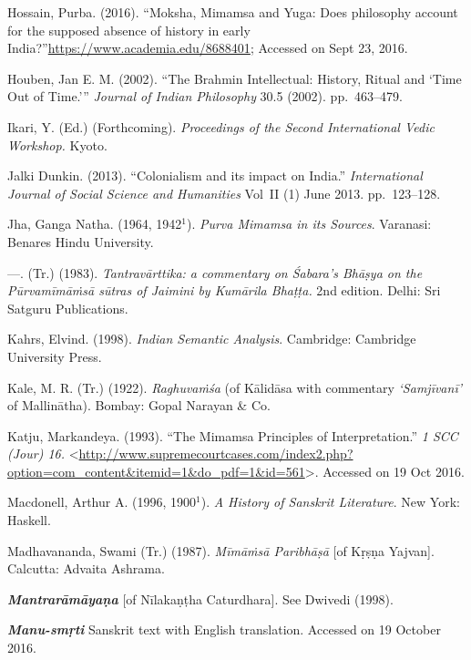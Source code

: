 \begin{thebibliography}{99}
  Hossain, Purba. (2016). “Moksha, Mimamsa and Yuga: Does philosophy account for the supposed absence of history in early India?”\break \url{https://www.academia.edu/8688401}; Accessed on Sept 23, 2016.

  Houben, Jan E. M. (2002). “The Brahmin Intellectual: History, Ritual and ‘Time Out of Time.’” \textit{Journal of Indian Philosophy} 30.5 (2002). pp.~463--479.

  Ikari, Y. (Ed.) (Forthcoming). \textit{Proceedings of the Second International Vedic Workshop.} Kyoto.

  Jalki Dunkin. (2013). “Colonialism and its impact on India.” \textit{International Journal of Social Science and Humanities} Vol~II (1) June 2013. pp.~123--128.

  Jha, Ganga Natha. (1964, 1942$^{1}$). \textit{Purva Mimamsa in its Sources}. Varanasi: Benares Hindu University.

  —. (Tr.) (1983). \textit{Tantravārttika: a commentary on Śabara's Bhāṣya on the Pūrvamīmāṁsā sūtras of Jaimini by Kumārila Bhaṭṭa.} 2nd edition. Delhi: Sri Satguru Publications.

  Kahrs, Elvind. (1998). \textit{Indian Semantic Analysis}. Cambridge: Cambridge University Press.

  Kale, M. R. (Tr.) (1922). \textit{Raghuvaṁśa} (of Kālidāsa with commentary \textit{‘Samjīvanī’} of Mallinātha). Bombay: Gopal Narayan \& Co.

  Katju, Markandeya. (1993). “The Mimamsa Principles of Interpretation.” \textit{1 SCC (Jour) 16.} \textless  \url{http://www.supremecourtcases.com/index2.php?option=com_content&itemid=1&do_pdf=1&id=561}\textgreater . Accessed on 19 Oct 2016.

  Macdonell, Arthur A. (1996, 1900$^{1}$). \textit{A History of Sanskrit Literature}. New York: Haskell.  

  Madhavananda, Swami (Tr.) (1987). \textit{Mīmāṁsā Paribhāṣā} [of Kṛṣṇa Yajvan]. Calcutta: Advaita Ashrama.

  \textbf{\textit{Mantrarāmāyaṇa}} [of Nīlakaṇṭha Caturdhara]. See Dwivedi (1998).

  \textbf{\textit{Manu-smṛti}} Sanskrit text with English translation. Accessed on 19 October 2016.


\end{thebibliography}
